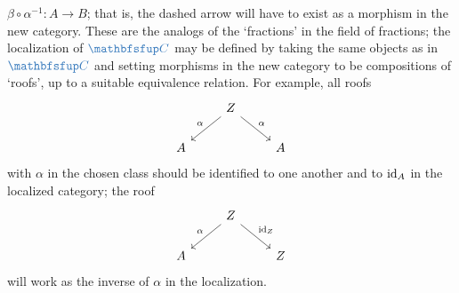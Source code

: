 $\beta \circ \alpha^{-1} : A \to B$; that is, the dashed arrow will
have to exist as a morphism in the new category. These are the analogs
of the `fractions' in the field of fractions; the localization of
$\categ{C}$ may be defined by taking the same objects as in
$\categ{C}$ and setting morphisms in the new category to be
compositions of `roofs', up to a suitable equivalence relation. For
example, all roofs
\[\begin{tikzcd}
    & Z \arrow[dl,"\alpha"'] \arrow[dr,"\alpha"] & \\
    A & & A
  \end{tikzcd}\] with $\alpha$ in the chosen class should be
identified to one another and to $\operatorname{id}_A$ in the localized category;
the roof
\[\begin{tikzcd}
    & Z \arrow[dl,"\alpha"'] \arrow[dr,"\id_Z"] & \\
    A & & Z
  \end{tikzcd}\] will work as the inverse of $\alpha$ in the
localization.

